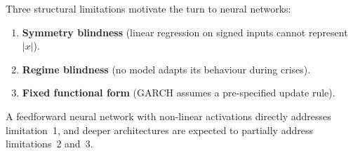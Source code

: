 Three structural limitations motivate the turn to neural networks:

\begin{enumerate}
  \item \textbf{Symmetry blindness} (linear regression on signed inputs cannot represent
        $|x|$).
  \item \textbf{Regime blindness} (no model adapts its behaviour during crises).
  \item \textbf{Fixed functional form} (GARCH assumes a pre-specified update rule).
\end{enumerate}

A feedforward neural network with non-linear activations directly addresses limitation~1,
and deeper architectures are expected to partially address limitations~2 and~3.
